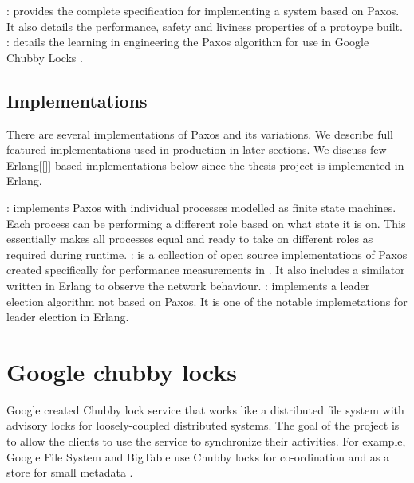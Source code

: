 \begin{itemize}
    : \citet{Kirsch08paxosfor} provides the
    complete specification for implementing a system based on Paxos. It also
    details the performance, safety and liviness properties of a protoype built.
    : \cite{ChandraGR07}
    details the learning in engineering the Paxos algorithm for use in
    Google Chubby Locks \citep{Burrows06}.
\end{itemize}

\subsection{Implementations}

There are several implementations of Paxos and its variations. We describe full
featured implementations used in production in later sections. We discuss few
Erlang[[]] based implementations below since the thesis project is implemented
in Erlang.

\begin{itemize}
    : \citep{Uenishi2012} implements Paxos with
    individual processes modelled as finite state machines. Each process can
    be performing a different role based on what state it is on. This 
    essentially makes all processes equal and ready to take on different roles
    as required during runtime.
    : \citet{Lugano2012} is a collection of open source 
    implementations of Paxos created specifically for performance measurements
    in \citet{MarandiPSP10}. It also includes a similator written in Erlang to
    observe the network behaviour.
    : \citet{Ulf2012} implements a leader election algorithm
    not based on Paxos. It is one of the notable implemetations for leader
    election in Erlang.
\end{itemize}

\section{Google chubby locks}
\label{section:chubby.locks}

Google created Chubby lock service \citep{Burrows06} that works like a 
distributed file system with advisory locks for loosely-coupled distributed 
systems. The goal of the project is to allow the clients to use the service
to synchronize their activities. For example, Google File System \citep{gfs} 
and BigTable \citep{ChangDGHWBCFG06} use Chubby locks for co-ordination and
as a store for small metadata \citep{ChandraGR07}.

